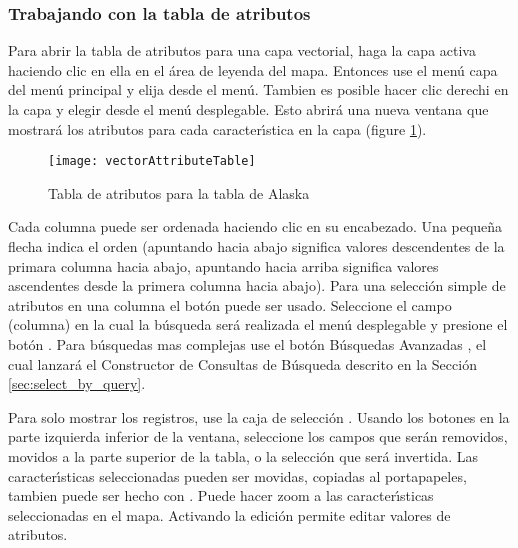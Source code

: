 \subsubsection{Trabajando con la tabla de atributos}\label{sec:attribute table}

Para abrir la tabla de atributos para una capa vectorial, haga la capa activa haciendo clic en ella en el \'area de leyenda del mapa. 
Entonces use el men\'u  capa del men\'u principal y elija  
desde el men\'u. Tambien es posible hacer clic derechi en la capa y elegir  
desde el men\'u desplegable. Esto abrir\'a una nueva ventana que mostrar\'a los atributos para cada caracter\'{\i}stica en la capa 
(figure \ref{fig:attributetable}).

\begin{figure}[ht]
   \begin{center}
   \caption{Tabla de atributos para la tabla de Alaska \nixcaption}\label{fig:attributetable}\smallskip
   \texttt{[image: vectorAttributeTable]}
\end{center} 
\end{figure}

Cada columna puede ser ordenada haciendo clic en su encabezado. Una peque\~na flecha indica el orden 
(apuntando hacia abajo significa valores descendentes de la primara columna hacia abajo, apuntando hacia arriba significa valores ascendentes desde la primera columna hacia abajo). 
Para una selecci\'on simple de atributos en una columna el bot\'on  
puede ser usado. Seleccione el campo (columna) en la cual la b\'usqueda ser\'a realizada 
el men\'u desplegable y presione el bot\'on . Para b\'usquedas mas complejas use
el bot\'on B\'usquedas Avanzadas , el cual lanzar\'a el Constructor de Consultas de B\'usqueda descrito en 
la Secci\'on \ref{sec:select_by_query}. 

Para solo mostrar los registros, use la caja de selecci\'on .
Usando los botones en la parte izquierda inferior de la ventana, seleccione los campos que ser\'an removidos, 
movidos a la parte superior de la tabla, o la selecci\'on que ser\'a invertida. Las caracter\'{\i}sticas seleccionadas pueden ser movidas, copiadas al portapapeles, tambien puede ser hecho con . Puede hacer zoom 
a las caracter\'{\i}sticas seleccionadas en el mapa. Activando la edici\'on permite editar valores de atributos. 

